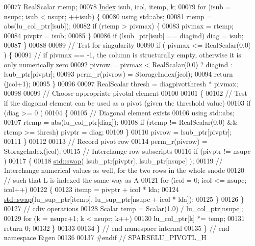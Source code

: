 \begin{DoxyCode}
00077   RealScalar rtemp;
00078   \hyperlink{namespace_eigen_a62e77e0933482dafde8fe197d9a2cfde}{Index} isub, icol, itemp, k; 
00079   \textcolor{keywordflow}{for} (isub = nsupc; isub < nsupr; ++isub) \{
00080     \textcolor{keyword}{using} std::abs;
00081     rtemp = abs(lu\_col\_ptr[isub]);
00082     \textcolor{keywordflow}{if} (rtemp > pivmax) \{
00083       pivmax = rtemp; 
00084       pivptr = isub;
00085     \} 
00086     \textcolor{keywordflow}{if} (lsub\_ptr[isub] == diagind) diag = isub;
00087   \}
00088   
00089   \textcolor{comment}{// Test for singularity}
00090   \textcolor{keywordflow}{if} ( pivmax <= RealScalar(0.0) ) \{
00091     \textcolor{comment}{// if pivmax == -1, the column is structurally empty, otherwise it is only numerically zero}
00092     pivrow = pivmax < RealScalar(0.0) ? diagind : lsub\_ptr[pivptr];
00093     perm\_r(pivrow) = StorageIndex(jcol);
00094     \textcolor{keywordflow}{return} (jcol+1);
00095   \}
00096   
00097   RealScalar thresh = diagpivotthresh * pivmax; 
00098   
00099   \textcolor{comment}{// Choose appropriate pivotal element }
00100   
00101   \{
00102     \textcolor{comment}{// Test if the diagonal element can be used as a pivot (given the threshold value)}
00103     \textcolor{keywordflow}{if} (diag >= 0 ) 
00104     \{
00105       \textcolor{comment}{// Diagonal element exists}
00106       \textcolor{keyword}{using} std::abs;
00107       rtemp = abs(lu\_col\_ptr[diag]);
00108       \textcolor{keywordflow}{if} (rtemp != RealScalar(0.0) && rtemp >= thresh) pivptr = diag;
00109     \}
00110     pivrow = lsub\_ptr[pivptr];
00111   \}
00112   
00113   \textcolor{comment}{// Record pivot row}
00114   perm\_r(pivrow) = StorageIndex(jcol);
00115   \textcolor{comment}{// Interchange row subscripts}
00116   \textcolor{keywordflow}{if} (pivptr != nsupc )
00117   \{
00118     \hyperlink{endian_8c_a3ca5ecd34b04d6a243c054ac3a57f68d}{std::swap}( lsub\_ptr[pivptr], lsub\_ptr[nsupc] );
00119     \textcolor{comment}{// Interchange numerical values as well, for the two rows in the whole snode}
00120     \textcolor{comment}{// such that L is indexed the same way as A}
00121     \textcolor{keywordflow}{for} (icol = 0; icol <= nsupc; icol++)
00122     \{
00123       itemp = pivptr + icol * lda; 
00124       \hyperlink{endian_8c_a3ca5ecd34b04d6a243c054ac3a57f68d}{std::swap}(lu\_sup\_ptr[itemp], lu\_sup\_ptr[nsupc + icol * lda]);
00125     \}
00126   \}
00127   \textcolor{comment}{// cdiv operations}
00128   Scalar temp = Scalar(1.0) / lu\_col\_ptr[nsupc];
00129   \textcolor{keywordflow}{for} (k = nsupc+1; k < nsupr; k++)
00130     lu\_col\_ptr[k] *= temp; 
00131   \textcolor{keywordflow}{return} 0;
00132 \}
00133 
00134 \} \textcolor{comment}{// end namespace internal}
00135 \} \textcolor{comment}{// end namespace Eigen}
00136 
00137 \textcolor{preprocessor}{#endif // SPARSELU\_PIVOTL\_H}
\end{DoxyCode}
